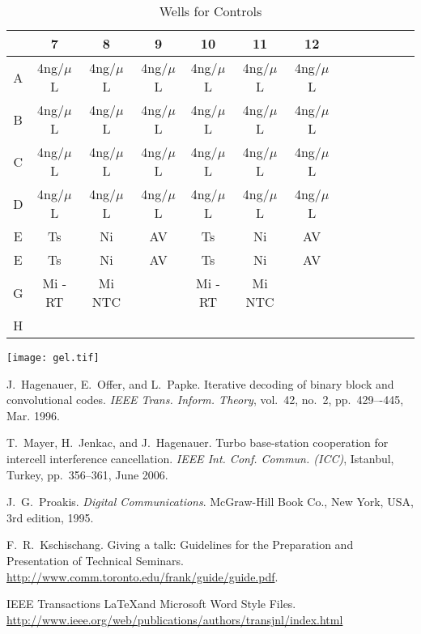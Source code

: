 \documentclass[journal, a4paper]{IEEEtran}
\begin{document}
  \begin{table}[!hbt]
    \begin{center}
    \caption{Wells for Controls}
    \label{tab:simParameters}
    \begin{tabular}{|c|c|c|c|c|c|c|c|c|c|c|c|c|}
      \hline
      & 7 & 8 & 9 & 10 & 11 & 12 \\
      \hline
      A & 4ng/$\mu$L & 4ng/$\mu$L & 4ng/$\mu$L & 4ng/$\mu$L & 4ng/$\mu$L & 4ng/$\mu$L\\
      \hline
      B & 4ng/$\mu$L & 4ng/$\mu$L & 4ng/$\mu$L & 4ng/$\mu$L & 4ng/$\mu$L & 4ng/$\mu$L\\
      \hline
      C & 4ng/$\mu$L & 4ng/$\mu$L & 4ng/$\mu$L & 4ng/$\mu$L & 4ng/$\mu$L & 4ng/$\mu$L\\
      \hline
      D & 4ng/$\mu$L & 4ng/$\mu$L & 4ng/$\mu$L & 4ng/$\mu$L & 4ng/$\mu$L & 4ng/$\mu$L\\
      \hline
      E & Ts & Ni & AV & Ts & Ni & AV\\
      \hline
      E & Ts & Ni & AV & Ts & Ni & AV\\
      \hline
      G & Mi -RT & Mi NTC & & Mi -RT & Mi NTC & \\
      \hline
      H & & & & & &\\
      \hline
    \end{tabular}
    \end{center}
  \end{table}

\texttt{[image: gel.tif]}

\begin{thebibliography}{5}
    J.~Hagenauer, E.~Offer, and L.~Papke. Iterative decoding of binary block
    and convolutional codes. {\em IEEE Trans. Inform. Theory},
    vol.~42, no.~2, pp.~429–-445, Mar. 1996.

    T.~Mayer, H.~Jenkac, and J.~Hagenauer. Turbo base-station cooperation for intercell interference cancellation. {\em IEEE Int. Conf. Commun. (ICC)}, Istanbul, Turkey, pp.~356--361, June 2006.

    J.~G.~Proakis. {\em Digital Communications}. McGraw-Hill Book Co.,
    New York, USA, 3rd edition, 1995.

    F.~R.~Kschischang. Giving a talk: Guidelines for the Preparation and Presentation of Technical Seminars.
    \url{http://www.comm.toronto.edu/frank/guide/guide.pdf}.

    IEEE Transactions \LaTeX and Microsoft Word Style Files.
    \url{http://www.ieee.org/web/publications/authors/transjnl/index.html}

\end{thebibliography}

\end{document}
